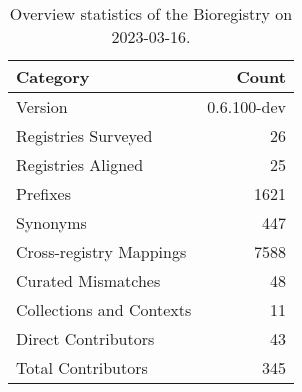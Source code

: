 \begin{table}
\centering
\caption{Overview statistics of the Bioregistry on 2023-03-16.}
\label{tab:bioregistry-summary}
\begin{tabular}{lr}
\toprule
                Category &       Count \\
\midrule
                 Version & 0.6.100-dev \\
     Registries Surveyed &          26 \\
      Registries Aligned &          25 \\
                Prefixes &        1621 \\
                Synonyms &         447 \\
 Cross-registry Mappings &        7588 \\
      Curated Mismatches &          48 \\
Collections and Contexts &          11 \\
     Direct Contributors &          43 \\
      Total Contributors &         345 \\
\bottomrule
\end{tabular}
\end{table}
